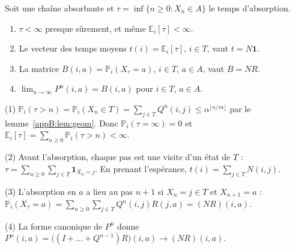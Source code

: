 \begin{theorem}\label{appB:thm:absorption}
Soit une chaîne absorbante et $\tau=\inf\{n\ge0:X_n\in A\}$ le temps d'absorption.
\begin{enumerate}
\item $\tau<\infty$ presque sûrement, et même $\mathbb E_i[\tau]<\infty$.
\item Le vecteur des temps moyens $t(i)=\mathbb E_i[\tau]$, $i\in T$, vaut $t=N\mathbf 1$.
\item La matrice $B(i,a)=\mathbb P_i(X_\tau=a)$, $i\in T$, $a\in A$, vaut $B=NR$.
\item $\lim_{n\to\infty}P^n(i,a)=B(i,a)$ pour $i\in T$, $a\in A$.
\end{enumerate}
\end{theorem}

\begin{humanproof}
(1) $\mathbb P_i(\tau>n)=\mathbb P_i(X_n\in T)=\sum_{j\in T}Q^n(i,j)\le\alpha^{\lfloor n/m\rfloor}$ par le
lemme~\ref{appB:lem:geom}. Donc $\mathbb P_i(\tau=\infty)=0$ et $\mathbb E_i[\tau]=\sum_{n\ge0}\mathbb P_i(\tau>n)<\infty$.

(2) Avant l'absorption, chaque pas est une visite d'un état de $T$ : $\tau=\sum_{n\ge0}\sum_{j\in T}\mathbf 1_{X_n=j}$.
En prenant l'espérance, $t(i)=\sum_{j\in T}N(i,j)$.

(3) L'absorption en $a$ a lieu au pas $n+1$ si $X_n=j\in T$ et $X_{n+1}=a$ :
$\mathbb P_i(X_\tau=a)=\sum_{n\ge0}\sum_{j\in T}Q^n(i,j)R(j,a)=(NR)(i,a)$.

(4) La forme canonique de $P^n$ donne $P^n(i,a)=\bigl((I+\dots+Q^{n-1})R\bigr)(i,a)\to(NR)(i,a)$.
\end{humanproof}

